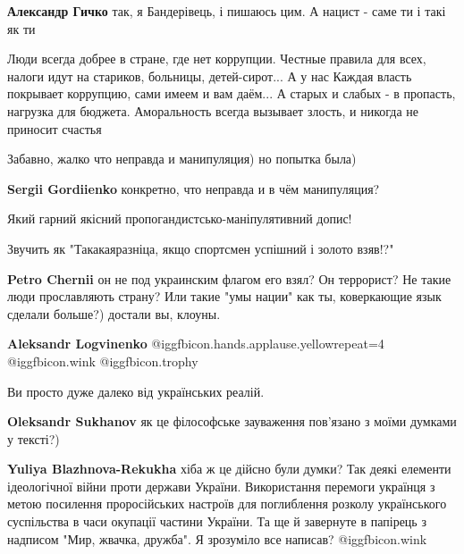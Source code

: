 \begin{itemize}
\begin{itemize}
\textbf{Александр Гичко} так, я Бандерівець, і пишаюсь цим. А нацист - саме ти і такі як ти

\end{itemize} %


Люди всегда добрее в стране, где нет коррупции. Честные правила для всех,
налоги идут на стариков, больницы, детей-сирот... А у нас Каждая власть
покрывает коррупцию, сами имеем и вам даём... А старых и слабых - в пропасть,
нагрузка для бюджета. Аморальность всегда вызывает злость, и никогда не
приносит счастья

Забавно, жалко что неправда и манипуляция) но попытка была)

\begin{itemize} %
\textbf{Sergii Gordiienko} конкретно, что неправда и в чём манипуляция?
\end{itemize} %


Який гарний якісний пропогандистсько-маніпулятивний допис!

Звучить як "Такакаяразніца, якщо спортсмен успішний і золото взяв!?"

\begin{itemize} %
\textbf{Petro Chernii} он не под украинским флагом его взял? Он террорист? Не такие люди прославляють страну? Или такие "умы нации" как ты, коверкающие язык сделали больше?) достали вы, клоуны.

\textbf{Aleksandr Logvinenko}  @igg{fbicon.hands.applause.yellow}{repeat=4}  @igg{fbicon.wink}  @igg{fbicon.trophy} 
\end{itemize} %

Ви просто дуже далеко від українських реалій.

\begin{itemize} %
\textbf{Oleksandr Sukhanov} як це філософське зауваження пов'язано з моїми думками у тексті?)

\textbf{Yuliya Blazhnova-Rekukha} хіба ж це дійсно були думки? Так деякі елементи ідеологічної війни проти держави України. Використання перемоги українця з метою посилення проросійських настроїв для поглиблення розколу українського суспільства в часи окупації частини України. Та ще й завернуте в папірець з надписом "Мир, жвачка, дружба". Я зрозуміло все написав?  @igg{fbicon.wink} 
\end{itemize} %


\end{itemize}
